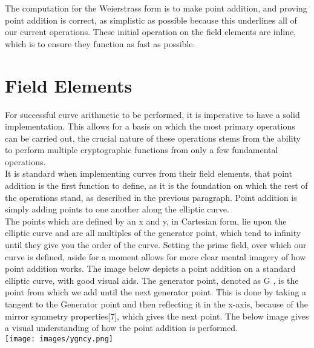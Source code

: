 \documentclass[letterpaper, 10 pt, conference]{ieeeconf}  %
\begin{document}
The computation for the Weierstrass form is to make point addition, and proving point addition is correct, as simplistic as possible because this underlines all of our current operations. These initial operation on the field elements are inline, which is to ensure they function as fast as possible. \\

\section{Field Elements}
For successful curve arithmetic to be performed, it is imperative to have a solid implementation. This allows for a basis on which the most primary operations can be carried out, the crucial nature of these operations stems from the ability to perform multiple cryptographic functions from only a few fundamental operations. \\
It is standard when implementing curves from their field elements, that point addition is the first function to define, as it is the foundation on which the rest of the operations stand, as described in the previous paragraph. Point addition is simply adding points to one another along the elliptic curve.\\
The points which are defined by an x and y, in Cartesian form, lie upon the elliptic curve and are all multiples of the generator point, which tend to infinity until they give you the order of the curve. Setting the prime field, over which our curve is defined, aside for a moment allows for more clear mental imagery of how point addition works. The image below depicts a point addition on a standard elliptic curve, with good visual aids. The generator point, denoted as G , is the point from which we add until the next generator point. This is done by taking a tangent to the Generator point and then reflecting it in the x-axis, because of the mirror symmetry properties[7], which gives the next point. The below image gives a visual understanding of how the point addition is performed.
\\

\texttt{[image: images/ygncy.png]}\\
\end{document}
